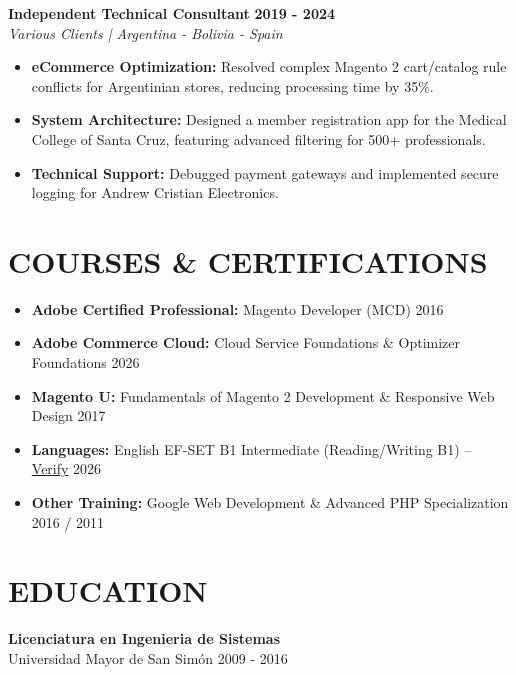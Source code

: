\documentclass[11pt, a4paper]{article}
\newcommand{\header}[1]{\section*{\fontsize{10.5}{11}\selectfont\bfseries\color{accent}\uppercase{#1}}}
\newcommand{\jobtitle}[2]{\textbf{#1} \hfill \textbf{\small #2}} %
\newcommand{\company}[1]{\textit{#1}} %
\begin{document}
	\jobtitle{Independent Technical Consultant}{2019 - 2024} \\

\company{Various Clients | Argentina - Bolivia - Spain}
	\begin{itemize}[noitemsep, topsep=2pt]
		\item \textbf{eCommerce Optimization:} Resolved complex Magento 2 cart/catalog rule conflicts for Argentinian stores, reducing processing time by 35\%.
		\item \textbf{System Architecture:} Designed a member registration app for the Medical College of Santa Cruz, featuring advanced filtering for 500+ professionals.
		\item \textbf{Technical Support:} Debugged payment gateways and implemented secure logging for Andrew Cristian Electronics.
	\end{itemize}
	
	
	\header{Courses \& Certifications}

\begin{itemize}[noitemsep, topsep=1pt]
	\item \textbf{Adobe Certified Professional:} Magento Developer (MCD) \hfill 2016
	\item \textbf{Adobe Commerce Cloud:} Cloud Service Foundations \& Optimizer Foundations \hfill 2026
	\item \textbf{Magento U:} Fundamentals of Magento 2 Development \& Responsive Web Design \hfill 2017
	\item \textbf{Languages:} English EF-SET B1 Intermediate (Reading/Writing B1) -- \href{https://cert.efset.org/es/YEZUkS}{Verify} \hfill 2026
	\item \textbf{Other Training:} Google Web Development \& Advanced PHP Specialization \hfill 2016 / 2011
\end{itemize}
	
	\header{Education}
	\textbf{Licenciatura en Ingenieria de Sistemas} \\
	Universidad Mayor de San Simón \hfill 2009 - 2016
	
\end{document}
